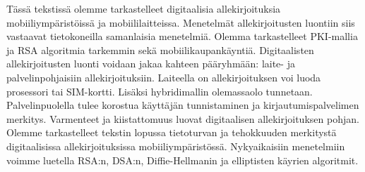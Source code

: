 \documentclass[finnish]{tktltiki2}
\theoremstyle{definition}
\theoremstyle{remark}
\begin{document}
Tässä tekstissä olemme tarkastelleet digitaalisia allekirjoituksia mobiiliympäristöissä ja mobiililaitteissa. Menetelmät allekirjoitusten luontiin siis vastaavat tietokoneilla samanlaisia menetelmiä. Olemma tarkastelleet PKI-mallia ja RSA algoritmia tarkemmin sekä mobiilikaupankäyntiä. Digitaalisten allekirjoitusten luonti voidaan jakaa kahteen pääryhmään: laite- ja palvelinpohjaisiin allekirjoituksiin. Laiteella on allekirjoituksen voi luoda prosessori tai SIM-kortti. Lisäksi hybridimallin olemassaolo tunnetaan. Palvelinpuolella tulee korostua käyttäjän tunnistaminen ja kirjautumispalvelimen merkitys. Varmenteet ja kiistattomuus luovat digitaalisen allekirjoituksen pohjan. Olemme tarkastelleet tekstin lopussa tietoturvan ja tehokkuuden merkitystä digitaalisissa allekirjoituksissa mobiiliympäristössä. Nykyaikaisiin menetelmiin voimme luetella RSA:n, DSA:n, Diffie-Hellmanin ja elliptisten käyrien algoritmit.


%
%
%

\newpage






 
\end{document}
